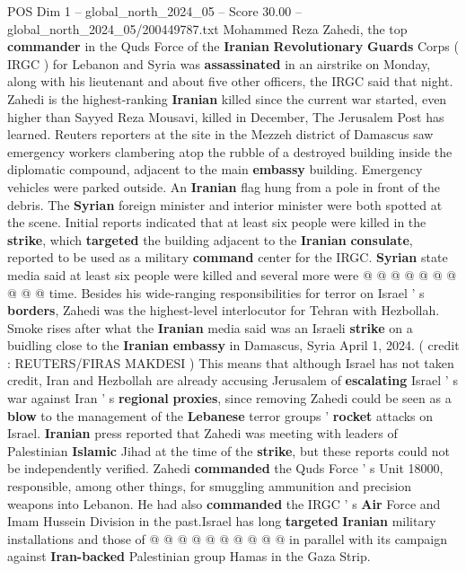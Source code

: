 \begin{textsample}{POS Dim 1 – global\_north\_2024\_05 – Score 30.00 – global\_north\_2024\_05/200449787.txt}  \label{ex:f1_pos_401}
Mohammed Reza Zahedi, the top \textbf{commander} in the Quds Force of the \textbf{Iranian} \textbf{Revolutionary} \textbf{Guards} Corps ( IRGC ) for Lebanon and Syria was \textbf{assassinated} in an airstrike on Monday, along with his lieutenant and about five other officers, the IRGC said that night.
Zahedi is the highest-ranking \textbf{Iranian} killed since the current war started, even higher than Sayyed Reza Mousavi, killed in December, The Jerusalem Post has learned.
Reuters reporters at the site in the Mezzeh district of Damascus saw emergency workers clambering atop the rubble of a destroyed building inside the diplomatic compound, adjacent to the main \textbf{embassy} building.
Emergency vehicles were parked outside.
An \textbf{Iranian} flag hung from a pole in front of the debris.
The \textbf{Syrian} foreign minister and interior minister were both spotted at the scene.
Initial reports indicated that at least six people were killed in the \textbf{strike}, which \textbf{targeted} the building adjacent to the \textbf{Iranian} \textbf{consulate}, reported to be used as a military \textbf{command} center for the IRGC. \textbf{Syrian} state media said at least six people were killed and several more were @ @ @ @ @ @ @ @ @ @ time.
Besides his wide-ranging responsibilities for terror on Israel ' s \textbf{borders}, Zahedi was the highest-level interlocutor for Tehran with Hezbollah.
Smoke rises after what the \textbf{Iranian} media said was an Israeli \textbf{strike} on a buidling close to the \textbf{Iranian} \textbf{embassy} in Damascus, Syria April 1, 2024. ( credit : REUTERS/FIRAS MAKDESI ) This means that although Israel has not taken credit, Iran and Hezbollah are already accusing Jerusalem of \textbf{escalating} Israel ' s war against Iran ' s \textbf{regional} \textbf{proxies}, since removing Zahedi could be seen as a \textbf{blow} to the management of the \textbf{Lebanese} terror groups ' \textbf{rocket} attacks on Israel. \textbf{Iranian} press reported that Zahedi was meeting with leaders of Palestinian \textbf{Islamic} Jihad at the time of the \textbf{strike}, but these reports could not be independently verified.
Zahedi \textbf{commanded} the Quds Force ' s Unit 18000, responsible, among other things, for smuggling ammunition and precision weapons into Lebanon.
He had also \textbf{commanded} the IRGC ' s \textbf{Air} Force and Imam Hussein Division in the past.Israel has long \textbf{targeted} \textbf{Iranian} military installations and those of @ @ @ @ @ @ @ @ @ @ in parallel with its campaign against \textbf{Iran-backed} Palestinian group Hamas in the Gaza Strip.

\end{textsample}
